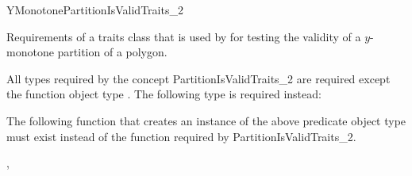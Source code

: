 

\begin{ccRefConcept}{YMonotonePartitionIsValidTraits_2}


\ccDefinition
  
Requirements of a traits class that is used 
by  for testing the validity of a
$y$-monotone partition of a polygon.

\ccTypes

All types required by the concept PartitionIsValidTraits\_2 are required
except the function object type . The following type is
required instead:


\ccOperations

The following function that creates an instance of the above predicate object
type must exist instead of the function  required by
PartitionIsValidTraits\_2.


\ccHasModels


\ccSeeAlso

,

\end{ccRefConcept}


